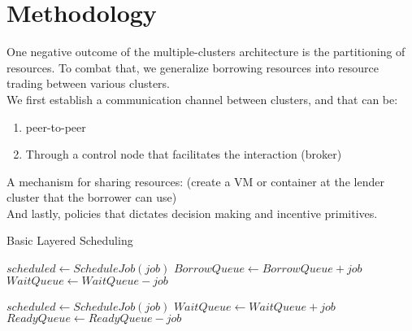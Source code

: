 \section{Methodology}
One negative outcome of the multiple-clusters architecture is the partitioning of resources. 
To combat that, we generalize borrowing resources into resource trading between various clusters. 
\\ We first establish a communication channel between clusters, and that can be:
\\ \begin{enumerate}
    \item peer-to-peer
    \item Through a control node that facilitates the interaction (broker)
\end{enumerate}
A mechanism for sharing resources: (create a VM or container at the lender cluster that the borrower can use)
\\ And lastly, policies that dictates decision making and incentive primitives. %

\begin{algorithm}
    \caption{Basic Layered Scheduling}
    \begin{algorithmic}
         
            \State $scheduled \gets ScheduleJob(job)$
            \State $BorrowQueue \gets BorrowQueue + job$
            \State $WaitQueue \gets WaitQueue - job$
            \EndIf
        \EndFor
    
         
            \State $scheduled \gets ScheduleJob(job)$
            \State $WaitQueue \gets WaitQueue + job$
            \State $ReadyQueue \gets ReadyQueue - job$
            \EndIf
        \EndFor
    \end{algorithmic}
    \end{algorithm}


